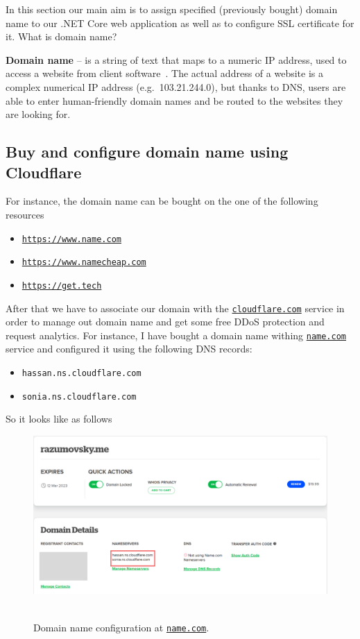 In this section our main aim is to assign specified (previously bought) domain name to our .NET Core web application
as well as to configure SSL certificate for it.
What is domain name?
\begin{center}
    \textbf{Domain name} -- is a string of text that maps to a numeric IP address, used to access a website
    from client software~\cite{DomanNameCloudflare}.
    The actual address of a website is a complex numerical IP address (e.g.\ 103.21.244.0), but thanks to DNS,
    users are able to enter human-friendly domain names and be routed to the websites they are looking for.
\end{center}

\subsection{Buy and configure domain name using Cloudflare}\label{subsec:buy-and-configure-domain-name-using-cloudflare}
For instance, the domain name can be bought on the one of the following resources
\begin{itemize}
    \item \href{https://www.name.com/}{\texttt{https://www.name.com}}
    \item \href{https://www.namecheap.com/}{\texttt{https://www.namecheap.com}}
    \item \href{https://get.tech/}{\texttt{https://get.tech}}
\end{itemize}
After that we have to associate our domain with the \href{https://www.cloudflare.com/}{\texttt{cloudflare.com}} service in order
to manage out domain name and get some free DDoS protection and request analytics.
For instance, I have bought a domain name withing \href{https://www.name.com/}{\texttt{name.com}} service
and configured it using the following DNS records:
\begin{itemize}
    \item \texttt{hassan.ns.cloudflare.com}
    \item \texttt{sonia.ns.cloudflare.com}
\end{itemize}
So it looks like as follows
\begin{figure}[H]
    \centering
    \includegraphics[width=1\textwidth]{img/07_domain_at_name_com}
    ~\caption{Domain name configuration at \href{https://www.name.com/}{\texttt{name.com}}.}\label{fig:figure18}
\end{figure}
